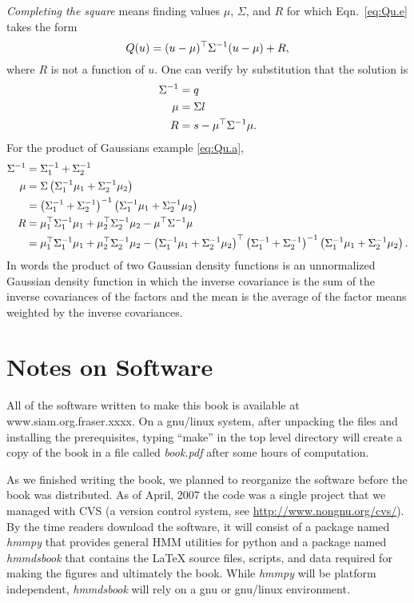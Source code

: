 \emph{Completing the square} means finding values $\mu$, $\Sigma$, and
$R$ for which Eqn.~\eqref{eq:Qu.e} takes the form
\begin{equation}
  \label{eq:Qu.f}
  Q(u) = (u - \mu)^\top \Sigma^{-1} (u - \mu) + R,
\end{equation}
where $R$ is not a function of $u$.  One can verify by substitution
that the solution is
\begin{align*}
  \Sigma^{-1} &= q\\
  \mu &= \Sigma l\\
  R &= s -  \mu^\top \Sigma^{-1} \mu.
\end{align*}
For the product of Gaussians example \eqref{eq:Qu.a},
\begin{align*}
  \Sigma^{-1} &= \Sigma_1^{-1} + \Sigma_2^{-1} \\
  \mu &= \Sigma \left( \Sigma_1^{-1} \mu_1 + \Sigma_2^{-1} \mu_2
  \right) \\
  &= \left( \Sigma_1^{-1} + \Sigma_2^{-1} \right)^{-1} \left(
  \Sigma_1^{-1} \mu_1 + \Sigma_2^{-1} \mu_2  \right) \\
  R &= \mu_1^\top \Sigma_1^{-1} \mu_1 + \mu_2^\top
  \Sigma_2^{-1} \mu_2 -  \mu^\top \Sigma^{-1} \mu \\
  &= \mu_1^\top \Sigma_1^{-1} \mu_1 + \mu_2^\top
  \Sigma_2^{-1} \mu_2 - \left( \Sigma_1^{-1} \mu_1 + \Sigma_2^{-1}
  \mu_2  \right) ^\top \left( \Sigma_1^{-1} + \Sigma_2^{-1}
  \right)^{-1} \left( \Sigma_1^{-1} \mu_1 + \Sigma_2^{-1} \mu_2
  \right).
\end{align*}
In words the product of two Gaussian density functions is an
unnormalized Gaussian density function in which the inverse covariance
is the sum of the inverse covariances of the factors and the mean is
the average of the factor means weighted by the inverse covariances.

\chapter{Notes on Software}
\label{cha:Software}

All of the software written to make this book is available at
www.siam.org.fraser.xxxx.  On a gnu/linux system, after unpacking the
files and installing the prerequisites, typing ``make'' in the top
level directory will create a copy of the book in a file called
\emph{book.pdf} after some hours of computation.

As we finished writing the book, we planned to reorganize the software
before the book was distributed.  As of April, 2007 the code was a
single project that we managed with CVS (a version control system, see
\url{http://www.nongnu.org/cvs/}).  By the time readers download the
software, it will consist of a package named \emph{hmmpy} that
provides general HMM utilities for python and a package named
\emph{hmmdsbook} that contains the LaTeX source files, scripts, and
data required for making the figures and ultimately the book.  While
\emph{hmmpy} will be platform independent, \emph{hmmdsbook} will rely
on a gnu or gnu/linux environment.

